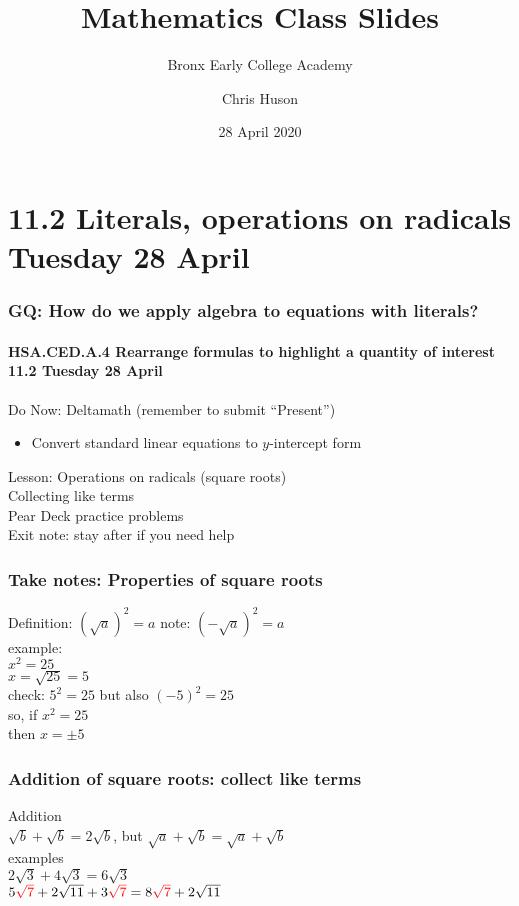 \documentclass{beamer}
\title{Mathematics Class Slides}
\subtitle{Bronx Early College Academy}
\author{Chris Huson}
\date{28 April 2020}
\begin{document}
\frame{\titlepage}
\section[Outline]{}
\frame{\tableofcontents}


\section{11.2 Literals, operations on radicals Tuesday 28 April} 
\frame
{
  \frametitle{GQ: How do we apply algebra to equations with literals?}
  \framesubtitle{HSA.CED.A.4 Rearrange formulas to highlight a quantity of interest \hfill \alert{11.2 Tuesday 28 April}}

  \begin{block}{Do Now: Deltamath (remember to submit ``Present'')}
    \begin{itemize}
      \item Convert standard linear equations to $y$-intercept form
    \end{itemize}

    \end{block}
    
    Lesson: Operations on radicals (square roots)\\
    Collecting like terms\\[0.25cm]
    Pear Deck practice problems \\[0.25cm]
    Exit note: stay after if you need help
}

\frame
{
  \frametitle{Take notes: Properties of square roots}

  \Large{
  Definition: $(\sqrt{a})^2=a$ \hfill note: $(-\sqrt{a})^2=a$ \\[1cm]
  example: \\ $x^2=25$ \\
  $x=\sqrt{25}=5$ \\[0.5cm] 
  check: $5^2=25$ \hfill but also $(-5)^2=25$\\[0.5cm]
  \hfill so, if $x^2=25$ \\ \hfill then $x=\pm 5$ \vspace{3cm}
  
}
}

\frame
{
  \frametitle{Addition of square roots: collect like terms}

  \Large{
  Addition \\
  $\sqrt{b}+\sqrt{b}=2\sqrt{b}$, \hfill but $\sqrt{a}+\sqrt{b}=\sqrt{a}+\sqrt{b}$ \\[1cm]
  examples\\
  $2\sqrt{3}+4\sqrt{3}=6\sqrt{3}$\\[1cm]
  $5{\color{red}\sqrt{7}}+2\sqrt{11}+3{\color{red}\sqrt{7}}=8{\color{red}\sqrt{7}}+2\sqrt{11}$\\[1cm]
  
}
}
\end{document}
